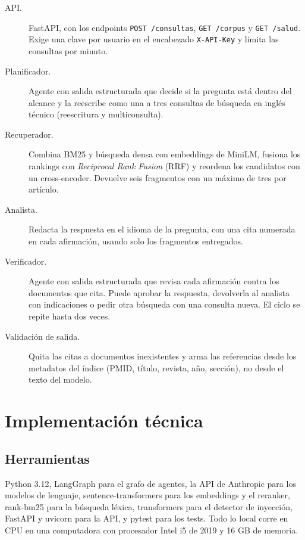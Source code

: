 \documentclass[11pt,a4paper]{article}
\begin{document}
\begin{description}
\item[API.] FastAPI, con los endpoints \texttt{POST /consultas}, \texttt{GET /corpus} y
\texttt{GET /salud}. Exige una clave por usuario en el encabezado \texttt{X-API-Key} y limita las
consultas por minuto.
\item[Planificador.] Agente con salida estructurada que decide si la pregunta está dentro del alcance
y la reescribe como una a tres consultas de búsqueda en inglés técnico (reescritura y multiconsulta).
\item[Recuperador.] Combina BM25 y búsqueda densa con embeddings de MiniLM, fusiona los rankings con
\textit{Reciprocal Rank Fusion} (RRF) y reordena los candidatos con un cross-encoder. Devuelve seis
fragmentos con un máximo de tres por artículo.
\item[Analista.] Redacta la respuesta en el idioma de la pregunta, con una cita numerada en cada
afirmación, usando solo los fragmentos entregados.
\item[Verificador.] Agente con salida estructurada que revisa cada afirmación contra los documentos
que cita. Puede aprobar la respuesta, devolverla al analista con indicaciones o pedir otra búsqueda
con una consulta nueva. El ciclo se repite hasta dos veces.
\item[Validación de salida.] Quita las citas a documentos inexistentes y arma las referencias desde
los metadatos del índice (PMID, título, revista, año, sección), no desde el texto del modelo.
\end{description}

\section{Implementación técnica}

\subsection{Herramientas}

Python 3.12, LangGraph para el grafo de agentes, la API de Anthropic para los modelos de lenguaje,
sentence-transformers para los embeddings y el reranker, rank-bm25 para la búsqueda léxica,
transformers para el detector de inyección, FastAPI y uvicorn para la API, y pytest para los tests.
Todo lo local corre en CPU en una computadora con procesador Intel i5 de 2019 y 16 GB de memoria.


\end{document}
